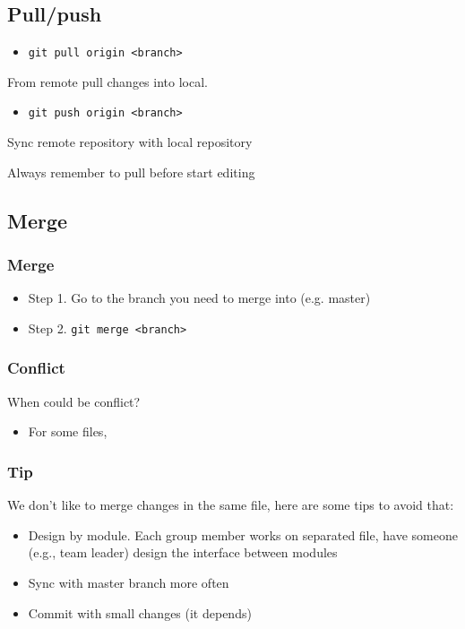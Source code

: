 \documentclass{beamer}
\begin{document}
		\subsection{Pull/push}
			\begin{frame}
				\begin{itemize}
					\item \texttt{git pull origin <branch>}
				\end{itemize}
				From remote pull changes into local.

				\begin{itemize}
					\item \texttt{git push origin <branch>}
				\end{itemize}
				Sync remote repository with local repository

				\begin{alertblock}[Important]
					Always remember to pull before start editing
				\end{alertblock}
			\end{frame}

		\subsection{Merge}
			\begin{frame}
				\frametitle{Merge}
				\begin{itemize}
					\item Step 1. Go to the branch you need to merge into (e.g. master)
					\item Step 2. \texttt{git merge <branch>}
				\end{itemize}
			\end{frame}

			\begin{frame}
				\frametitle{Conflict}
				When could be conflict?
				\begin{itemize}
					\item For some files, 
				\end{itemize}
			\end{frame}

			\begin{frame}
				\frametitle{Tip}
				We don't like to merge changes in the same file, here are some tips to avoid that:
				\begin{itemize}
					\item Design by module. Each group member works on separated file, have someone (e.g., team leader) design the interface between modules
					\item Sync with master branch more often
					\item Commit with small changes (it depends)
				\end{itemize}
			\end{frame}
\end{document}
